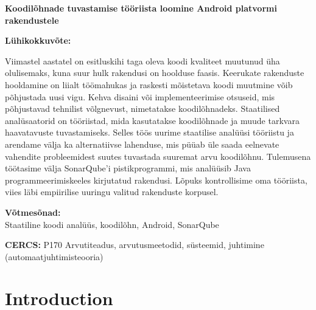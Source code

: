 \documentclass[12pt]{article}
\begin{document}
    \newcommand\EstInfo{{%
    \selectlanguage{estonian}
    \noindent\textbf{\large Koodilõhnade tuvastamise tööriista loomine Android platvormi rakendustele}
    \vspace*{1ex}

    \noindent\textbf{Lühikokkuvõte:}

    \noident
    Viimastel aastatel on esitluskihi taga oleva koodi kvaliteet muutunud üha olulisemaks, kuna suur hulk rakendusi on hoolduse faasis.
    Keerukate rakenduste hooldamine on liialt töömahukas ja raskesti mõistetava koodi muutmine võib põhjustada uusi vigu.
    Kehva disaini või implementeerimise otsuseid, mis põhjustavad tehnilist võlgnevust, nimetatakse koodilõhnadeks.
    Staatilised analüsaatorid on tööriistad, mida kasutatakse koodilõhnade ja muude tarkvara haavatavuste tuvastamiseks.
    Selles töös uurime staatilise analüüsi tööriistu ja arendame välja ka alternatiivse lahenduse,
    mis püüab üle saada eelnevate vahendite probleemidest suutes tuvastada suuremat arvu koodilõhnu.
    Tulemusena töötasime välja SonarQube'i pistikprogrammi, mis analüüsib Java programmeerimiskeeles kirjutatud rakendusi.
    Lõpuks kontrollisime oma tööriista, viies läbi empiirilise uuringu valitud rakenduste korpusel.

    \vspace*{1ex}

    \noindent\textbf{Võtmesõnad:}\\
    Staatiline koodi analüüs, koodilõhn, Android, SonarQube

    \vspace*{1ex}

    \noindent\textbf{CERCS:} P170 Arvutiteadus, arvutusmeetodid, süsteemid, juhtimine (automaatjuhtimisteooria)

    \vspace*{1ex}
    }}%


    \EngInfo

    \newpage
    \EstInfo


    \newpage
    \tableofcontents

    \newpage

    \section{Introduction}\label{sec:introduction}

    
\end{document}
